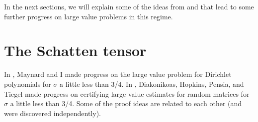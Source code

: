 \documentclass{amsart}
\begin{document}







In the next sections, we will explain some of the ideas from \cite{GM} and \cite{DHPT} that lead to some further progress on large value problems in this regime. 


\section{The Schatten tensor} \label{secschatten}

In \cite{GM}, Maynard and I made progress on the large value problem for Dirichlet polynomials for $\sigma$ a little less than 3/4.   In \cite{DHPT},  Diakonikoas, Hopkins, Pensia, and Tiegel made progress on certifying large value estimates for random matrices for $\sigma$ a little less than 3/4.  Some of the proof ideas are related to each other (and were discovered independently).
\end{document}
